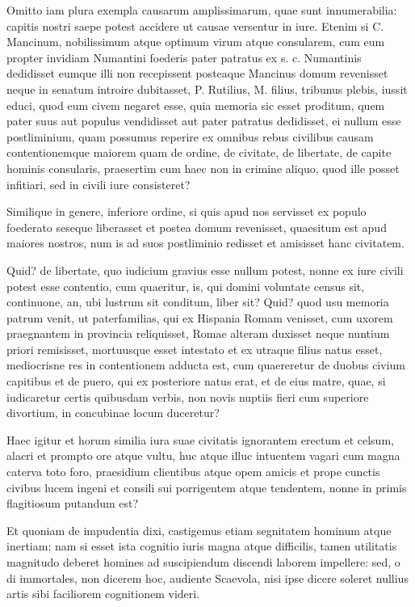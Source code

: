  Omitto iam plura exempla causarum amplissimarum, quae sunt innumerabilia: capitis nostri saepe potest accidere ut causae versentur in iure. Etenim si C. Mancinum, nobilissimum atque optimum virum atque consularem, cum eum propter invidiam Numantini foederis pater patratus ex s. c. Numantinis dedidisset eumque illi non recepissent posteaque Mancinus domum revenisset neque in senatum introire dubitasset, P. Rutilius, M. filius, tribunus plebis, iussit educi, quod eum civem negaret esse, quia memoria sic esset proditum, quem pater suus aut populus vendidisset aut pater patratus dedidisset, ei nullum esse postliminium, quam possumus reperire ex omnibus rebus civilibus causam contentionemque maiorem quam de ordine, de civitate, de libertate, de capite hominis consularis, praesertim cum haec non in crimine aliquo, quod ille posset infitiari, sed in civili iure consisteret?

 Similique in genere, inferiore ordine, si quis apud nos servisset ex populo foederato seseque liberasset et postea domum revenisset, quaesitum est apud maiores nostros, num is ad suos postliminio redisset et amisisset hanc civitatem.

 Quid? de libertate, quo iudicium gravius esse nullum potest, nonne ex iure civili potest esse contentio, cum quaeritur, is, qui domini voluntate census sit, continuone, an, ubi lustrum sit conditum, liber sit? Quid? quod usu memoria patrum venit, ut paterfamilias, qui ex Hispania Romam venisset, cum uxorem praegnantem in provincia reliquisset, Romae alteram duxisset neque nuntium priori remisisset, mortuusque esset intestato et ex utraque filius natus esset, mediocrisne res in contentionem adducta est, cum quaereretur de duobus civium capitibus et de puero, qui ex posteriore natus erat, et de eius matre, quae, si iudicaretur certis quibusdam verbis, non novis nuptiis fieri cum superiore divortium, in concubinae locum duceretur?

 Haec igitur et horum similia iura suae civitatis ignorantem erectum et celsum, alacri et prompto ore atque vultu, huc atque illuc intuentem vagari cum magna caterva toto foro, praesidium clientibus atque opem amicis et prope cunctis civibus lucem ingeni et consili sui porrigentem atque tendentem, nonne in primis flagitiosum putandum est?

 Et quoniam de impudentia dixi, castigemus etiam segnitatem hominum atque inertiam; nam si esset ista cognitio iuris magna atque difficilis, tamen utilitatis magnitudo deberet homines ad suscipiendum discendi laborem impellere: sed, o di immortales, non dicerem hoc, audiente Scaevola, nisi ipse dicere soleret nullius artis sibi faciliorem cognitionem videri.

